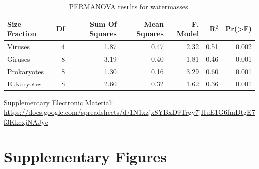 \documentclass[fleqn,10pt]{wlscirep}
\begin{document}
\begin{table}[ht]
\centering
\begin{tabular}{lrrrrrr}
\hline
Size Fraction & Df & Sum Of Squares & Mean Squares & F. Model & R$^2$ & Pr(>F) \\
\hline
\hline
Viruses	& 4	& 1.87 &	0.47 & 2.32 &	0.51 &	0.002\\
Giruses	& 8	& 3.19 &	0.40 & 1.81 &	0.46 &	0.001\\
Prokaryotes & 8	& 1.30 &	0.16 & 3.29 &	0.60 &	0.001\\
Eukaryotes	& 8	& 2.60 &	0.32 & 1.62 &	0.36 &	0.001\\
\hline
\hline
\end{tabular}
\caption{\label{tab:PWM} PERMANOVA results for watermasses.}
\end{table}

Supplementary Electronic Material: \href{https://docs.google.com/spreadsheets/d/1N1xzjx8YBxD9Trgy7jHuE1G6fmDtgE7f3KkcxjNAJyc}{https://docs.google.com/spreadsheets/d/1N1xzjx8YBxD9Trgy7jHuE1G6fmDtgE7f3KkcxjNAJyc}

\clearpage

\section*{Supplementary Figures}
\end{document}
